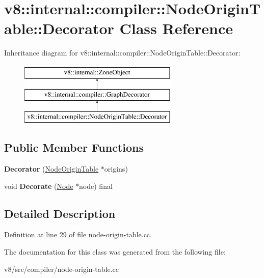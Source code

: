 \hypertarget{classv8_1_1internal_1_1compiler_1_1NodeOriginTable_1_1Decorator}{}\section{v8\+:\+:internal\+:\+:compiler\+:\+:Node\+Origin\+Table\+:\+:Decorator Class Reference}
\label{classv8_1_1internal_1_1compiler_1_1NodeOriginTable_1_1Decorator}
Inheritance diagram for v8\+:\+:internal\+:\+:compiler\+:\+:Node\+Origin\+Table\+:\+:Decorator\+:\begin{figure}[H]
\begin{center}
\leavevmode
\includegraphics[height=3.000000cm]{classv8_1_1internal_1_1compiler_1_1NodeOriginTable_1_1Decorator}
\end{center}
\end{figure}
\subsection*{Public Member Functions}
\begin{DoxyCompactItemize}
\item 
\mbox{\label{classv8_1_1internal_1_1compiler_1_1NodeOriginTable_1_1Decorator_a5cc4c7d4ad16ef1994b28f467d94ad28}} 
{\bfseries Decorator} (\mbox{\hyperlink{classv8_1_1internal_1_1compiler_1_1NodeOriginTable}{Node\+Origin\+Table}} $\ast$origins)
\item 
\mbox{\label{classv8_1_1internal_1_1compiler_1_1NodeOriginTable_1_1Decorator_a20c57a20e39fa468d5ade4b444c1a42a}} 
void {\bfseries Decorate} (\mbox{\hyperlink{classv8_1_1internal_1_1compiler_1_1Node}{Node}} $\ast$node) final
\end{DoxyCompactItemize}


\subsection{Detailed Description}


Definition at line 29 of file node-\/origin-\/table.\+cc.



The documentation for this class was generated from the following file\+:\begin{DoxyCompactItemize}
\item 
v8/src/compiler/node-\/origin-\/table.\+cc\end{DoxyCompactItemize}
